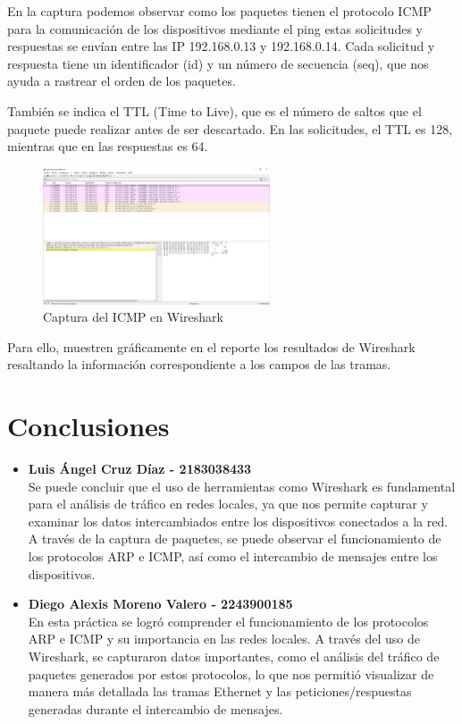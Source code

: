 \begin{enumerate}
            En la captura podemos observar como los paquetes tienen el protocolo ICMP para la comunicación de los dispositivos mediante el ping estas solicitudes y respuestas se envían entre las IP 192.168.0.13 y 192.168.0.14. Cada solicitud y respuesta tiene un identificador (id) y un número de secuencia (seq), que nos ayuda a rastrear el orden de los paquetes.

            También se indica el TTL (Time to Live), que es el número de saltos que el paquete puede realizar antes de ser descartado. En las solicitudes, el TTL es 128, mientras que en las respuestas es 64.
            \begin{figure}[H]
                \centering
                \includegraphics[width=0.6\textwidth]{img/ICMP.PNG}
                \caption{Captura del ICMP en Wireshark}
                \label{fig:ICMP}
            \end{figure}
            
        \end{enumerate}
        Para ello, muestren gráficamente en el reporte los resultados de Wireshark resaltando la información correspondiente a los campos de las tramas.
    
    \section{Conclusiones}

    \begin{itemize}
        \item \textbf{Luis Ángel Cruz Díaz - 2183038433} \\
        Se puede concluir que el uso de herramientas como Wireshark es fundamental para el análisis de tráfico en redes locales, ya que nos permite capturar y examinar los datos intercambiados entre los dispositivos conectados a la red. A través de la captura de paquetes, se puede observar el funcionamiento de los protocolos ARP e ICMP, así como el intercambio de mensajes entre los dispositivos.
        \item \textbf{Diego Alexis Moreno Valero - 2243900185}\\
        En esta práctica se logró comprender el funcionamiento de los protocolos ARP e ICMP y su importancia en las redes locales. A través del uso de Wireshark, se capturaron datos importantes, como el análisis del tráfico de paquetes generados por estos protocolos, lo que nos permitió visualizar de manera más detallada las tramas Ethernet y las peticiones/respuestas generadas durante el intercambio de mensajes.
        
    \end{itemize}
    
